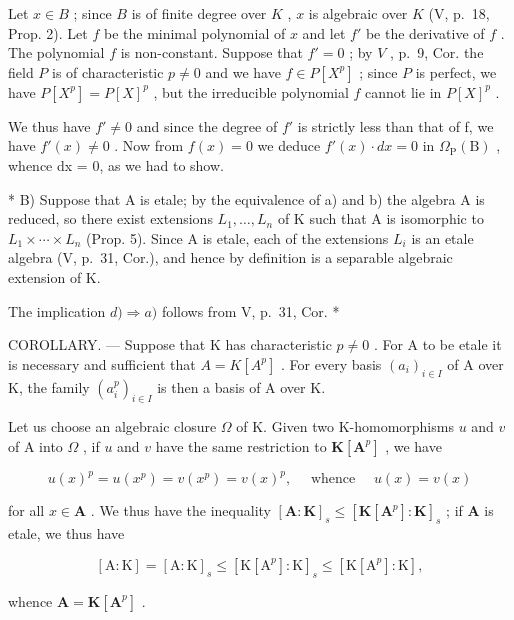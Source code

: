 Let \(x \in B\) ; since \(B\) is of finite degree over \(K\) , \(x\) is algebraic over \(K\) (V, p.~18, Prop. 2). Let \(f\) be the minimal polynomial of \(x\) and let \(f'\) be the derivative of \(f\) . The polynomial \(f\) is non-constant. Suppose that \(f' = 0\) ; by \(V\) , p.~9, Cor. the field \(P\) is of characteristic \(p \neq 0\) and we have \(f \in P[X^p]\) ; since \(P\) is perfect, we have \(P[X^p] = P[X]^p\) , but the irreducible polynomial \(f\) cannot lie in \(P[X]^p\) .

We thus have \(f' \neq 0\) and since the degree of \(f'\) is strictly less than that of f, we have \(f'(x) \neq 0\) . Now from \(f(x) = 0\) we deduce \(f'(x) \cdot dx = 0\) in \(\Omega_{\mathrm{P}}(\mathrm{B})\) , whence dx = 0, as we had to show.

* B) Suppose that A is etale; by the equivalence of a) and b) the algebra A is reduced, so there exist extensions \(L_{1}, \ldots, L_{n}\) of K such that A is isomorphic to \(L_{1} \times \cdots \times L_{n}\) (Prop. 5). Since A is etale, each of the extensions \(L_{i}\) is an etale algebra (V, p.~31, Cor.), and hence by definition is a separable algebraic extension of K.

The implication \(d) \Rightarrow a)\) follows from V, p.~31, Cor. *

COROLLARY. --- Suppose that K has characteristic \(p \neq 0\) . For A to be etale it is necessary and sufficient that \(A = K[A^{p}]\) . For every basis \((a_{i})_{i \in I}\) of A over K, the family \((a_{i}^{p})_{i \in I}\) is then a basis of A over K.

Let us choose an algebraic closure \(\Omega\) of K. Given two K-homomorphisms \(u\) and \(v\) of A into \(\Omega\) , if \(u\) and \(v\) have the same restriction to \(\mathbf{K}[\mathbf{A}^p]\) , we have

\[
u (x) ^ {p} = u \left(x ^ {p}\right) = v \left(x ^ {p}\right) = v (x) ^ {p}, \quad \text { whence } \quad u (x) = v (x)
\]

for all \(x \in \mathbf{A}\) . We thus have the inequality \([\mathbf{A} : \mathbf{K}]_s \leqslant [\mathbf{K}[\mathbf{A}^p] : \mathbf{K}]_s\) ; if \(\mathbf{A}\) is etale, we thus have

\[
[ \mathrm{A}: \mathrm{K} ] = [ \mathrm{A}: \mathrm{K} ] _ {s} \leqslant [ \mathrm{K} [ \mathrm{A} ^ {p} ]: \mathrm{K} ] _ {s} \leqslant [ \mathrm{K} [ \mathrm{A} ^ {p} ]: \mathrm{K} ],
\]

whence \(\mathbf{A} = \mathbf{K}[\mathbf{A}^p]\) .

